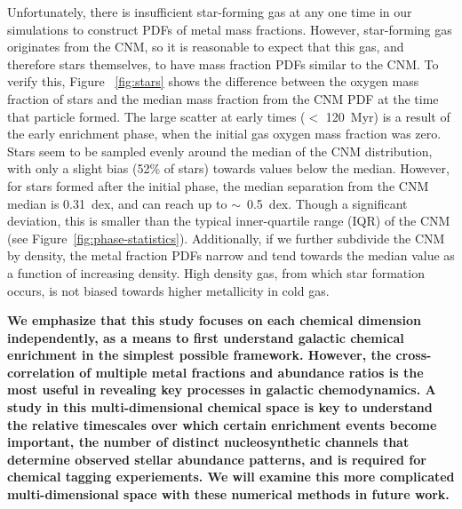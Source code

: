 \documentclass[twocolumn]{aastex61}
\begin{document}
Unfortunately, there is insufficient star-forming gas at any one time in our simulations to construct PDFs of 
    metal mass fractions. 
However, star-forming gas originates from the CNM, so it is reasonable to expect that this gas, and therefore stars themselves, 
   to have mass fraction PDFs similar
to the CNM. To verify this, Figure ~\ref{fig:stars} shows the difference between the oxygen mass fraction of stars and the median mass fraction from the CNM PDF at the time that particle formed. The large scatter at early times ($<$ 120~Myr) is a result of the early enrichment phase, when the initial gas oxygen mass fraction was zero. Stars seem to be sampled evenly around the median of the CNM distribution, with only a slight bias (52\% of stars) towards values below the median. However, for stars formed after the initial phase, the median separation from the CNM median is 0.31~dex, and can reach up to $\sim$~0.5~dex. Though a significant deviation, this is smaller than the typical inner-quartile range (IQR) of the CNM (see Figure~\ref{fig:phase-statistics}). Additionally, if we further subdivide the CNM by density, the metal fraction PDFs narrow and tend towards the median value as a function of increasing density. High density gas, from which star formation occurs, is not biased towards higher metallicity in cold gas.

\textbf{We emphasize that this study focuses on each chemical dimension independently, as a means to first understand galactic chemical enrichment in the simplest possible framework. However, the cross-correlation of multiple metal fractions and abundance ratios is the most useful in revealing key processes in galactic chemodynamics. A study in this multi-dimensional chemical space is key to understand the relative timescales over which certain enrichment events become important, the number of distinct nucleosynthetic channels that determine observed stellar abundance patterns, and is required for chemical tagging experiements. We will examine this more complicated multi-dimensional space with these 
   numerical methods
in future work.}
\end{document}

